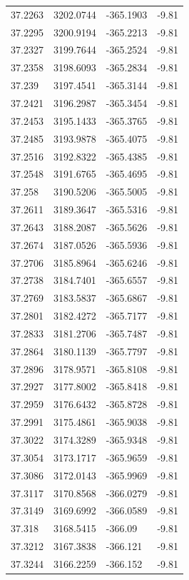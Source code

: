 \begin{table}[H]
\begin{tabular}{llll}
37.2263 & 3202.0744 & -365.1903 & -9.81 \\
37.2295 & 3200.9194 & -365.2213 & -9.81 \\
37.2327 & 3199.7644 & -365.2524 & -9.81 \\
37.2358 & 3198.6093 & -365.2834 & -9.81 \\
37.239 & 3197.4541 & -365.3144 & -9.81 \\
37.2421 & 3196.2987 & -365.3454 & -9.81 \\
37.2453 & 3195.1433 & -365.3765 & -9.81 \\
37.2485 & 3193.9878 & -365.4075 & -9.81 \\
37.2516 & 3192.8322 & -365.4385 & -9.81 \\
37.2548 & 3191.6765 & -365.4695 & -9.81 \\
37.258 & 3190.5206 & -365.5005 & -9.81 \\
37.2611 & 3189.3647 & -365.5316 & -9.81 \\
37.2643 & 3188.2087 & -365.5626 & -9.81 \\
37.2674 & 3187.0526 & -365.5936 & -9.81 \\
37.2706 & 3185.8964 & -365.6246 & -9.81 \\
37.2738 & 3184.7401 & -365.6557 & -9.81 \\
37.2769 & 3183.5837 & -365.6867 & -9.81 \\
37.2801 & 3182.4272 & -365.7177 & -9.81 \\
37.2833 & 3181.2706 & -365.7487 & -9.81 \\
37.2864 & 3180.1139 & -365.7797 & -9.81 \\
37.2896 & 3178.9571 & -365.8108 & -9.81 \\
37.2927 & 3177.8002 & -365.8418 & -9.81 \\
37.2959 & 3176.6432 & -365.8728 & -9.81 \\
37.2991 & 3175.4861 & -365.9038 & -9.81 \\
37.3022 & 3174.3289 & -365.9348 & -9.81 \\
37.3054 & 3173.1717 & -365.9659 & -9.81 \\
37.3086 & 3172.0143 & -365.9969 & -9.81 \\
37.3117 & 3170.8568 & -366.0279 & -9.81 \\
37.3149 & 3169.6992 & -366.0589 & -9.81 \\
37.318 & 3168.5415 & -366.09 & -9.81 \\
37.3212 & 3167.3838 & -366.121 & -9.81 \\
37.3244 & 3166.2259 & -366.152 & -9.81 \\

\end{tabular}
\end{table}
